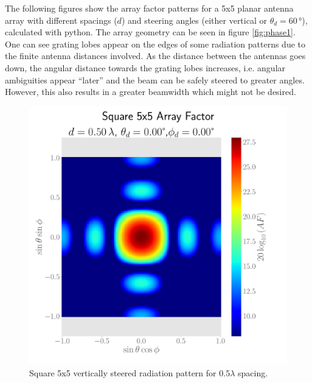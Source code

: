 
The following figures show the array factor patterns for a 5x5 planar antenna array with different spacings ($d$) and steering angles (either vertical or $\theta_{d}=60\,\si{\degree}$), calculated with python. The array geometry can be seen in figure \ref{fig:phase1}.\\

One can see grating lobes appear on the edges of some radiation patterns due to the finite antenna distances involved. As the distance between the antennas goes down, the angular distance towards the grating lobes increases, i.e. angular ambiguities appear ``later'' and the beam can be safely steered to greater angles. However, this also results in a greater beamwidth which might not be desired.\\

\begin{figure}[H]
  \begin{minipage}[t]{0.45\textwidth}
    \centering
    \includegraphics[width=\textwidth]{graphics/task_1/square-0.50-lambda-0.00-theta-0.00-phi-radpat.pdf}
    \caption{Square 5x5 vertically steered radiation pattern for $0.5\lambda$ spacing.}\label{fig:rad-square-0.5-0}
  \end{minipage}\hfill
  \begin{minipage}[t]{0.45\textwidth}
    \centering

\end{minipage}
\end{figure}
